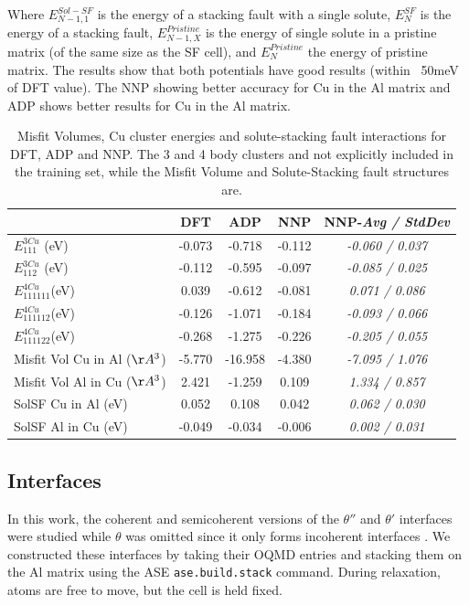 \documentclass{article}
\begin{document}
Where $E^{Sol-SF}_{N-1,1}$ is the energy of a stacking fault with a single solute,
$E^{SF}_{N}$ is the energy of a stacking fault,
$E^{Pristine}_{N-1,X}$ is the energy of single solute in a pristine matrix (of the same size as the SF cell), 
and $E^{Pristine}_{N}$ the energy of pristine matrix. 
The results show that both potentials have good results (within ~50meV of DFT value).
The NNP showing better accuracy for Cu in the Al matrix and ADP shows better results for Cu in the Al matrix.


\begin{table}[h!]
\begin{tabular}{l|cccc}%
\hline%
&DFT&ADP&NNP& NNP-\emph{Avg / StdDev}\\%
\hline%
$E^{3Cu}_{111}$ (eV)&-0.073&{-}0.718&{-}0.112&\emph{-0.060 / 0.037}\\%
$E^{3Cu}_{112}$ (eV)&-0.112&{-}0.595&{-}0.097&\emph{-0.085 / 0.025}\\%
$E^{4Cu}_{111111}$(eV)&0.039&{-}0.612&{-}0.081&\emph{0.071 / 0.086}\\%
$E^{4Cu}_{111112}$(eV)&-0.126&{-}1.071&{-}0.184&\emph{-0.093 / 0.066}\\%
$E^{4Cu}_{111122}$(eV)&-0.268&{-}1.275&{-}0.226&\emph{-0.205 / 0.055}\\%
Misfit Vol Cu in Al ($\AA^3$)&{-}5.770&{-}16.958&{-}4.380&\emph{-7.095 / 1.076}\\%
Misfit Vol Al in Cu ($\AA^3$)&2.421&{-}1.259&0.109&\emph{1.334 / 0.857}\\%
SolSF Cu in Al (eV)&0.052&0.108&0.042&\emph{0.062 / 0.030}\\%
SolSF Al in Cu (eV)&{-}0.049&{-}0.034&{-}0.006&\emph{0.002 / 0.031}\\%
\end{tabular}%
\caption{Misfit Volumes, Cu cluster energies and solute-stacking fault interactions for DFT, ADP and NNP. 
The 3 and 4 body clusters and not explicitly included in the training set, while the Misfit Volume and 
Solute-Stacking fault structures are.}
\label{table:solute_special}
\end{table}

\subsection{Interfaces}
In this work, the coherent and semicoherent versions of the $\theta''$ and $\theta'$ interfaces were studied while $\theta$ was omitted since it only forms incoherent interfaces \cite{Nie2014PhysicalAlloys}.
We constructed these interfaces by taking their OQMD entries and stacking them on the Al matrix using the ASE \texttt{ase.build.stack} command.
During relaxation, atoms are free to move, but the cell is held fixed. 
\end{document}

